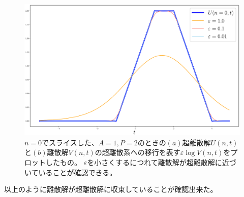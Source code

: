 \documentclass{jsarticle}
\begin{document}
\begin{enumerate}
\begin{figure}[H]
\begin{center}
\includegraphics[width=14cm]{lv_a1p2_n0.eps}
\caption{$n=0$でスライスした、$A=1,P=2$のときの$(a)$超離散解$U(n,t)$と$(b)$離散解$V(n,t)$の超離散系への移行を表す$\varepsilon\log V(n,t)$をプロットしたもの。
$\varepsilon$を小さくするにつれて離散解が超離散解に近づいていることが確認できる。}
\label{fig:ud_a1p2_n0}
\end{center}
\end{figure}

以上のように離散解が超離散解に収束していることが確認出来た。
\end{enumerate}
\end{document}
